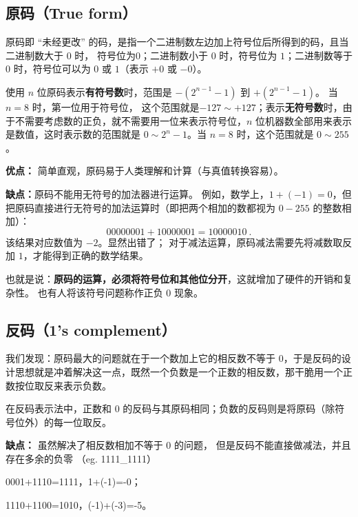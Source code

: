 
\subsection{原码（True form）}

原码即 “未经更改” 的码，是指一个二进制数左边加上符号位后所得到的码，且当二进制数大于 $0$ 时， 符号位为0；二进制数小于 $0$ 时，符号位为 $1$；二进制数等于 $0$ 时，符号位可以为 $0$ 或 $1$（表示 $+0$ 或 $-0$）。

使用 $n$ 位原码表示\textbf{有符号数}时，范围是 $-(2^{n-1}-1)$ 到 $+(2^{n-1}-1)$。 当 $n=8$ 时，第一位用于符号位， 这个范围就是$-127\sim +127 $；表示\textbf{无符号数}时，由于不需要考虑数的正负，就不需要用一位来表示符号位，$n$ 位机器数全部用来表示是数值，这时表示数的范围就是 $0\sim 2^{n}-1$。当 $n=8$ 时，这个范围就是 $0\sim 255$。


\textbf{优点：}
简单直观，原码易于人类理解和计算（与真值转换容易）。

\textbf{缺点：}原码不能用无符号的加法器进行运算。 例如，数学上，$1+(-1)=0$，但把原码直接进行无符号的加法运算时（即把两个相加的数都视为 $0-255$ 的整数相加）：
\begin{equation}
00000001 + 10000001=10000010~.
\end{equation}
该结果对应数值为 $-2$。显然出错了；
对于减法运算，原码减法需要先将减数取反加 $1$，才能得到正确的数学结果。

也就是说：\textbf{原码的运算，必须将符号位和其他位分开}，这就增加了硬件的开销和复杂性。 也有人将该符号问题称作正负 $0$ 现象。

\subsection{反码（1's complement）}
我们发现：原码最大的问题就在于一个数加上它的相反数不等于 $0$，于是反码的设计思想就是冲着解决这一点，既然一个负数是一个正数的相反数，那干脆用一个正数按位取反来表示负数。

在反码表示法中，正数和 $0$ 的反码与其原码相同；负数的反码则是将原码（除符号位外）的每一位取反。

\textbf{缺点：}
虽然解决了相反数相加不等于 $0$ 的问题， 但是反码不能直接做减法，并且存在多余的负零 （eg. 1111_1111）

\begin{example}{}
0001+1110=1111，1+(-1)=-0；

1110+1100=1010，(-1)+(-3)=-5。
\end{example}

